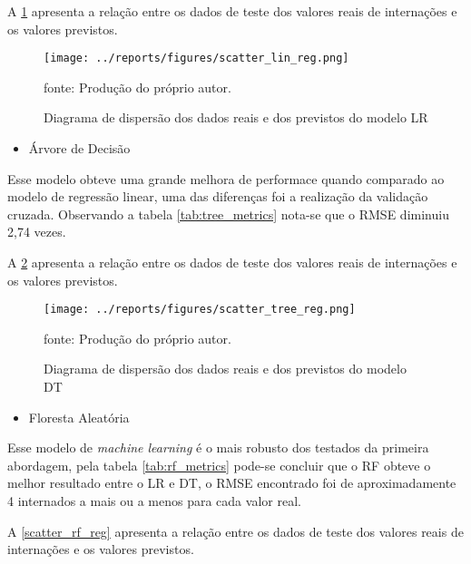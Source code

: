 \documentclass[
  12pt,		%
  a4paper,	%
  openright,%
  oneside,	%
  chapter=TITLE,		%
  section=TITLE,		%
  english,	%
  french,	%
  spanish,	%
  brazil	%
]{abntex2}
\begin{document}
    A \ref*{scatter_lin_reg} apresenta a relação entre os dados de teste dos valores reais de internações e os valores previstos.

    \begin{figure}[ht]
        \centering
        \caption{Diagrama de dispersão dos dados reais e dos previstos do modelo LR}
        \texttt{[image: ../reports/figures/scatter\_lin\_reg.png]}
        \label{scatter_lin_reg}
        \par
        {\small fonte: Produção do próprio autor.}
    \end{figure}

    \begin{itemize}
        \item Árvore de Decisão
    \end{itemize}

    Esse modelo obteve uma grande melhora de performace quando comparado ao modelo de regressão linear, uma das diferenças foi
    a realização da validação cruzada. Observando a tabela \ref*{tab:tree_metrics} nota-se que o RMSE diminuiu 2,74 vezes.


    

    A \ref*{scatter_tree_reg} apresenta a relação entre os dados de teste dos valores reais de internações e os valores previstos.

    \begin{figure}[ht]
        \centering
        \caption{Diagrama de dispersão dos dados reais e dos previstos do modelo DT}
        \texttt{[image: ../reports/figures/scatter\_tree\_reg.png]}
        \label{scatter_tree_reg}
        \par
        {\small fonte: Produção do próprio autor.}
    \end{figure}

    \begin{itemize}
        \item Floresta Aleatória
    \end{itemize}

    Esse modelo de \textit{machine learning} é o mais robusto dos testados da primeira abordagem, pela tabela \ref*{tab:rf_metrics}
    pode-se concluir que o RF obteve o melhor resultado entre o LR e DT, o RMSE encontrado foi de aproximadamente 4 internados
    a mais ou a menos para cada valor real.

    

    A \ref*{scatter_rf_reg} apresenta a relação entre os dados de teste dos valores reais de internações e os valores previstos.
\end{document}
